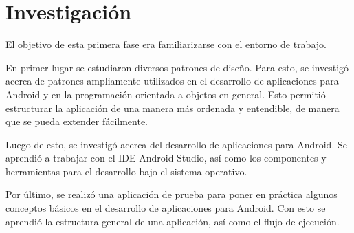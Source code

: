 \section{Investigación} \label{sect:Investigacion}

El objetivo de esta primera fase era familiarizarse con el entorno de trabajo.

En primer lugar se estudiaron diversos patrones de diseño. Para esto, se investigó acerca de patrones ampliamente utilizados en el desarrollo de aplicaciones para Android y en la programación orientada a objetos en general. Esto permitió estructurar la aplicación de una manera más ordenada y entendible, de manera que se pueda extender fácilmente.

Luego de esto, se investigó acerca del desarrollo de aplicaciones para Android. Se aprendió a trabajar con el IDE Android Studio, así como los componentes y herramientas para el desarrollo bajo el sistema operativo.

Por último, se realizó una aplicación de prueba para poner en práctica algunos conceptos básicos en el desarrollo de aplicaciones para Android. Con esto se aprendió la estructura general de una aplicación, así como el flujo de ejecución.


